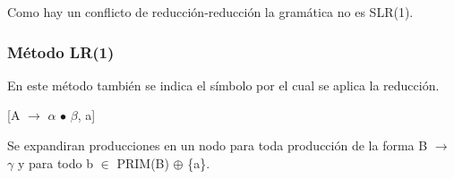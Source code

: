 \documentclass[\main/ApuntesPL.tex]{subfiles}
\begin{document}
        \par
        Como hay un conflicto de reducción-reducción la gramática no es SLR(1).

      \subsubsection{Método LR(1)}
        \par
        En este método también se indica el símbolo por el cual se aplica la
        reducción.
        \begin{center}
          [A $\rightarrow$ $\alpha$ $\bullet$ $\beta$, a]
        \end{center}

        \begin{center}
        \end{center}

        \par
        Se expandiran producciones en un nodo para toda producción de la forma
        B $\rightarrow$ $\gamma$ y para todo b $\in$ PRIM(B) $\oplus$ \{a\}.
\end{document}
